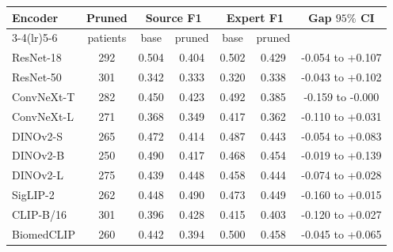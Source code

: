 \begin{tabular}{@{}lcccccc@{}}\toprule
Encoder & Pruned & \multicolumn{2}{c}{Source F1} & \multicolumn{2}{c}{Expert F1} & Gap $95\%$ CI\\
\cmidrule(lr){3-4}\cmidrule(lr){5-6} & patients & base & pruned & base & pruned & \\\midrule
ResNet-18 & 292 & 0.504 & 0.404 & 0.502 & 0.429 & -0.054 to +0.107\\
ResNet-50 & 301 & 0.342 & 0.333 & 0.320 & 0.338 & -0.043 to +0.102\\
ConvNeXt-T & 282 & 0.450 & 0.423 & 0.492 & 0.385 & -0.159 to -0.000\\
ConvNeXt-L & 271 & 0.368 & 0.349 & 0.417 & 0.362 & -0.110 to +0.031\\
DINOv2-S & 265 & 0.472 & 0.414 & 0.487 & 0.443 & -0.054 to +0.083\\
DINOv2-B & 250 & 0.490 & 0.417 & 0.468 & 0.454 & -0.019 to +0.139\\
DINOv2-L & 275 & 0.439 & 0.448 & 0.458 & 0.444 & -0.074 to +0.028\\
SigLIP-2 & 262 & 0.448 & 0.490 & 0.473 & 0.449 & -0.160 to +0.015\\
CLIP-B/16 & 301 & 0.396 & 0.428 & 0.415 & 0.403 & -0.120 to +0.027\\
BiomedCLIP & 260 & 0.442 & 0.394 & 0.500 & 0.458 & -0.045 to +0.065\\
\bottomrule\end{tabular}
